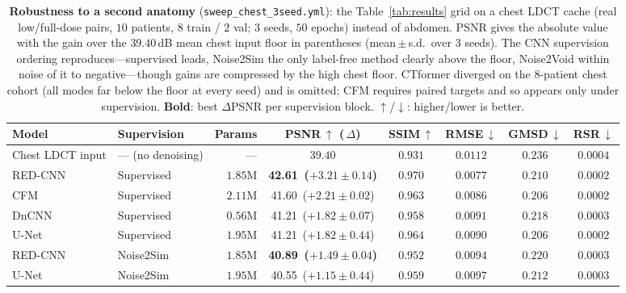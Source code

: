 \begin{table}[t]
  \centering
  \small
  \caption{\textbf{Robustness to a second anatomy} (\texttt{sweep\_chest\_3seed.yml}):
           the Table~\ref{tab:results} grid on a chest LDCT cache (real
           low/full-dose pairs, $10$ patients, $8$ train / $2$ val; $3$ seeds,
           $50$ epochs) instead of
           abdomen.  PSNR gives the absolute value with the gain over the
           $39.40$\,dB mean chest input floor in parentheses (mean\,$\pm$\,s.d.\
           over $3$ seeds).  The CNN supervision
           ordering reproduces---supervised leads, Noise2Sim the only label-free
           method clearly above the floor, Noise2Void within noise of it to
           negative---though gains are compressed by the high chest floor.  CTformer
           diverged on the $8$-patient chest cohort (all modes far below the floor
           at every seed) and
           is omitted; CFM requires paired targets and so appears only under
           supervision.  \textbf{Bold}: best $\Delta$PSNR per supervision block.
           $\uparrow$/$\downarrow$: higher/lower is better.}
  \label{tab:chest}
  \begin{tabular}{llrccccc}
    \toprule
    \textbf{Model} & \textbf{Supervision} & \textbf{Params} &
    PSNR\,$\uparrow$ (\,$\Delta$) & SSIM\,$\uparrow$ & RMSE\,$\downarrow$ &
    GMSD\,$\downarrow$ & RSR\,$\downarrow$ \\
    \midrule
    Chest LDCT input & --- (no denoising) & --- & $39.40$ & $0.931$ & $0.0112$ & $0.236$ & $0.0004$ \\
    \midrule
    RED-CNN~\cite{chen2017lowdose}   & Supervised & $1.85\mathrm{M}$ & \textbf{42.61 \,($+3.21{\pm}0.14$)} & $0.970$ & $0.0077$ & $0.210$ & $0.0002$ \\
    CFM~\cite{lipman2022flow}        & Supervised & $2.11\mathrm{M}$ & 41.60 \,($+2.21{\pm}0.02$) & $0.963$ & $0.0086$ & $0.206$ & $0.0002$ \\
    DnCNN~\cite{zhang2017beyond}     & Supervised & $0.56\mathrm{M}$ & 41.21 \,($+1.82{\pm}0.07$) & $0.958$ & $0.0091$ & $0.218$ & $0.0003$ \\
    U-Net                            & Supervised & $1.95\mathrm{M}$ & 41.21 \,($+1.82{\pm}0.44$) & $0.964$ & $0.0090$ & $0.206$ & $0.0002$ \\
    \midrule
    RED-CNN~\cite{chen2017lowdose}   & Noise2Sim~\cite{niu2020noise2sim} & $1.85\mathrm{M}$ & \textbf{40.89 \,($+1.49{\pm}0.04$)} & $0.952$ & $0.0094$ & $0.220$ & $0.0003$ \\
    U-Net                            & Noise2Sim~\cite{niu2020noise2sim} & $1.95\mathrm{M}$ & 40.55 \,($+1.15{\pm}0.44$) & $0.959$ & $0.0097$ & $0.212$ & $0.0003$ \\

\end{tabular}
\end{table}

